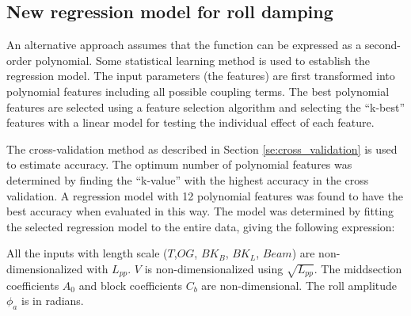 \subsection{New regression model for roll damping}
An alternative approach assumes that the function can be expressed as a second-order polynomial. Some statistical learning method is used to establish the regression model. The input parameters (the features) are first transformed into polynomial features including all possible coupling terms. The best polynomial features are selected using a feature selection algorithm and selecting the ``k-best'' features with a linear model for testing the individual effect of each feature. 

The cross-validation method as described in Section \ref{se:cross_validation} is used to estimate accuracy. The optimum number of polynomial features was determined by finding the ``k-value'' with the highest accuracy in the cross validation. A regression model with 12 polynomial features was found to have the best accuracy when evaluated in this way. The model was determined by fitting the selected regression model to the entire data, giving the following expression:


All the inputs with length scale ($T$,$OG$, $BK_{B}$, $BK_{L}$, $Beam$) are non-dimensionalized with $L_{pp}$. $V$ is non-dimensionalized using $\sqrt{L_{pp}}$. The middsection coefficients $A_0$ and block coefficients $C_b$ are non-dimensional. The roll amplitude $\phi_a$ is in radians.


